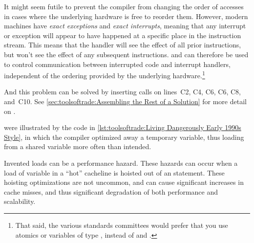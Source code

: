 \begin{description}[labelsep=.4em]
It might seem futile to prevent the compiler from changing the order of
accesses in cases where the underlying hardware is free to reorder them.
However, modern machines have \emph{exact exceptions} and
\emph{exact interrupts}, meaning that any interrupt or exception will
appear to have happened at a specific place in the instruction
stream.
This means that the handler will see the effect of all prior
instructions, but won't see the effect of any subsequent instructions.
 and  can therefore be used to
control communication between interrupted code and interrupt handlers,
independent of the ordering provided by the underlying hardware.\footnote{
	That said, the various standards committees would prefer that
	you use atomics or variables of type , instead
	of  and .}

And this problem can be solved by inserting 
calls on lines~C2, C4, C6, C6, C8, and~C10.
See
\cref{sec:toolsoftrade:Assembling the Rest of a Solution}
for more detail on .

\QuickQuizEnd

\item[Invented loads] were illustrated by the code in
\cref{lst:toolsoftrade:Living Dangerously Early 1990s Style},
in which the compiler optimized away a temporary variable,
thus loading from a shared variable more often than intended.

Invented loads can be a performance hazard.
These hazards can occur when a load of variable in a ``hot''
cacheline is hoisted out of an  statement.
These hoisting optimizations are not uncommon, and can cause significant
increases in cache misses, and thus significant degradation of
both performance and scalability.


\end{description}
